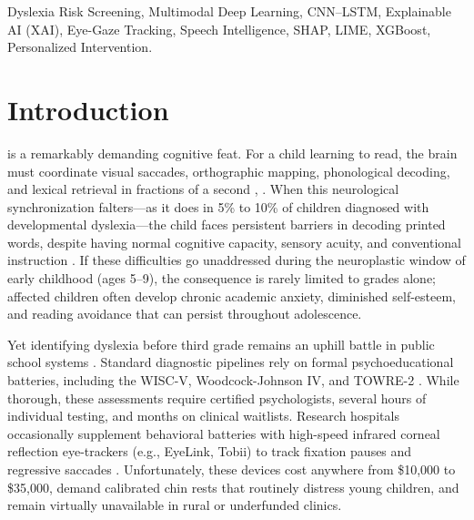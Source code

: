 \documentclass[conference]{IEEEtran}
\begin{document}
\begin{IEEEkeywords}
Dyslexia Risk Screening, Multimodal Deep Learning, CNN--LSTM, Explainable AI (XAI), Eye-Gaze Tracking, Speech Intelligence, SHAP, LIME, XGBoost, Personalized Intervention.
\end{IEEEkeywords}

\section{Introduction}
 is a remarkably demanding cognitive feat. For a child learning to read, the brain must coordinate visual saccades, orthographic mapping, phonological decoding, and lexical retrieval in fractions of a second \cite{b1}, \cite{b2}. When this neurological synchronization falters—as it does in 5\% to 10\% of children diagnosed with developmental dyslexia—the child faces persistent barriers in decoding printed words, despite having normal cognitive capacity, sensory acuity, and conventional instruction \cite{b3}. If these difficulties go unaddressed during the neuroplastic window of early childhood (ages 5--9), the consequence is rarely limited to grades alone; affected children often develop chronic academic anxiety, diminished self-esteem, and reading avoidance that can persist throughout adolescence.

Yet identifying dyslexia before third grade remains an uphill battle in public school systems \cite{b4}. Standard diagnostic pipelines rely on formal psychoeducational batteries, including the WISC-V, Woodcock-Johnson IV, and TOWRE-2 \cite{b5}. While thorough, these assessments require certified psychologists, several hours of individual testing, and months on clinical waitlists. Research hospitals occasionally supplement behavioral batteries with high-speed infrared corneal reflection eye-trackers (e.g., EyeLink, Tobii) to track fixation pauses and regressive saccades \cite{b6}. Unfortunately, these devices cost anywhere from \$10,000 to \$35,000, demand calibrated chin rests that routinely distress young children, and remain virtually unavailable in rural or underfunded clinics.
\end{document}
